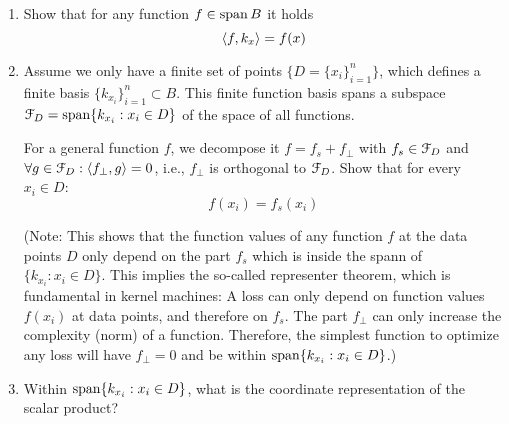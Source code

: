 \begin{enumerate}
\item Show that for any function $f\in\operatorname{span} B$ it holds
$$\left\langle f, k_x\right\rangle = f(x) $$


\item Assume we only have a finite set of points $\{ D =\{x_i\}_{i=1}^n \}$, which defines a finite basis $\{k_{x_i}\}_{i=1}^n\subset B$. This finite function basis spans a subspace ${\cal F}_D = \operatorname{span}\{k_{x_i} : x_i \in D\}$ of the space of all functions.

For a general function $f$, we decompose it $f=f_s + f_\bot$ with $f_s \in {\cal F}_D$ and $\forall g\in{\cal F}_D: \left\langle f_{\bot}, g\right\rangle=0$, i.e., $f_\bot$ is orthogonal to ${\cal F}_D$. Show that for every $x_i \in D$:
$$f(x_i) = f_s(x_i)$$


(Note: This shows that the function values of any function $f$ at the
data points $D$ only depend on the part $f_s$ which is inside the spann of
$\{k_{x_i} : x_i \in D\}$. This implies the so-called representer
theorem, which is fundamental in kernel machines: A loss can only
depend on function values $f(x_i)$ at data points, and therefore on
$f_s$. The part $f_\bot$ can only increase the complexity (norm) of a
function. Therefore, the simplest function to optimize any loss will
have $f_\bot=0$ and be within $\operatorname{span}\{k_{x_i} : x_i \in D\}$.)



\item Within $\operatorname{span}\{k_{x_i} : x_i \in D\}$, what is the coordinate
representation of the scalar product?

\end{enumerate}


\exerfoot
